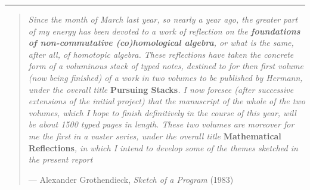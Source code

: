\documentclass[12pt]{article}
\renewcommand{\texttt}[1]{%
  \begingroup
  \ttfamily
  \begingroup\lccode`~=`/\lowercase{\endgroup\def~}{/\discretionary{}{}{}}%
  \begingroup\lccode`~=`[\lowercase{\endgroup\def~}{[\discretionary{}{}{}}%
  \begingroup\lccode`~=`.\lowercase{\endgroup\def~}{.\discretionary{}{}{}}%
  \catcode`/=\active\catcode`[=\active\catcode`.=\active
  \scantokens{#1\noexpand}%
  \endgroup
}
\begin{document}

\begin{center}\rule{0.5\linewidth}{0.5pt}\end{center}

\begin{quote}
\emph{Since the month of March last year, so nearly a year ago, the
greater part of my energy has been devoted to a work of reflection on
the \textbf{foundations of non-commutative (co)homological algebra}, or
what is the same, after all, of homotopic algebra. These reflections
have taken the concrete form of a voluminous stack of typed notes,
destined to for then first volume (now being finished) of a work in two
volumes to be published by Hermann, under the overall title}
\textbf{Pursuing Stacks}\emph{. I now foresee (after successive
extensions of the initial project) that the manuscript of the whole of
the two volumes, which I hope to finish definitively in the course of
this year, will be about 1500 typed pages in length. These two volumes
are moreover for me the first in a vaster series, under the overall
title} \textbf{Mathematical Reflections}\emph{, in which I intend to
develop some of the themes sketched in the present report}

--- Alexander Grothendieck,
\textsl{Sketch of a Program} (1983)
\end{quote}
\end{document}
